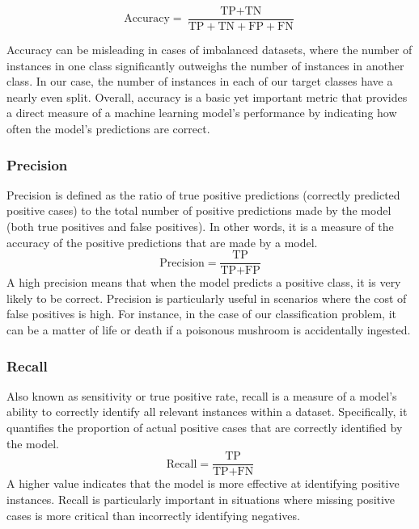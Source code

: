 \documentclass[11pt, conference]{IEEEtran}
\begin{document}
    \begin{equation}
        \text{Accuracy} = \frac{\text{TP} + \text{TN}}{\text{TP} + \text{TN} + \text{FP} + \text{FN}}\label{eq1}
    \end{equation}
    
    Accuracy can be misleading in cases of imbalanced datasets, where the number of instances in one class significantly outweighs the number of instances in another class. In our case, the number of instances in each of our target classes have a nearly even split. Overall, accuracy is a basic yet important metric that provides a direct measure of a machine learning model's performance by indicating how often the model's predictions are correct. 

    \subsubsection{Precision}
    Precision is defined as the ratio of true positive predictions (correctly predicted positive cases) to the total number of positive predictions made by the model (both true positives and false positives). In other words, it is a measure of the accuracy of the positive predictions that are made by a model. 
    \begin{equation}
        \text{Precision} = \frac{\text{TP}}{\text{TP} + \text{FP}}\label{eq2}
    \end{equation}
    A high precision means that when the model predicts a positive class, it is very likely to be correct. Precision is particularly useful in scenarios where the cost of false positives is high. For instance, in the case of our classification problem, it can be a matter of life or death if a poisonous mushroom is accidentally ingested.
    
    \subsubsection{Recall}
    Also known as sensitivity or true positive rate, recall is a measure of a model's ability to correctly identify all relevant instances within a dataset. Specifically, it quantifies the proportion of actual positive cases that are correctly identified by the model.
    \begin{equation}
        \text{Recall} = \frac{\text{TP}}{\text{TP} + \text{FN}}\label{eq3}
    \end{equation}
    A higher value indicates that the model is more effective at identifying positive instances. Recall is particularly important in situations where missing positive cases is more critical than incorrectly identifying negatives.
    
\end{document}

